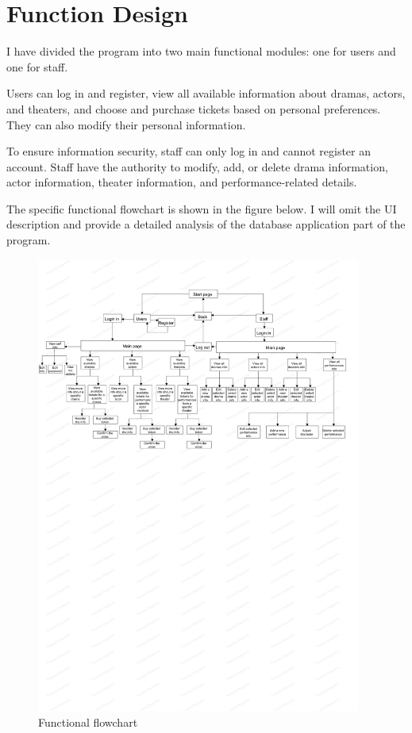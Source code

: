 \documentclass[12pt]{article}
\begin{document}
\section{Function Design}
\par I have divided the program into two main functional modules: one for users and one for staff.
\par Users can log in and register, view all available information about dramas, actors, and theaters, and choose and purchase tickets based on personal preferences. They can also modify their personal information.
\par To ensure information security, staff can only log in and cannot register an account. Staff have the authority to modify, add, or delete drama information, actor information, theater information, and performance-related details.
\par The specific functional flowchart is shown in the figure below. I will omit the UI description and provide a detailed analysis of the database application part of the program.
\begin{figure}[h]
    \centering
    \includegraphics[width=0.95\textwidth]{Figure2.pdf}
    \caption{Functional flowchart}
    \label{Figure 2}
\end{figure}
\end{document}
